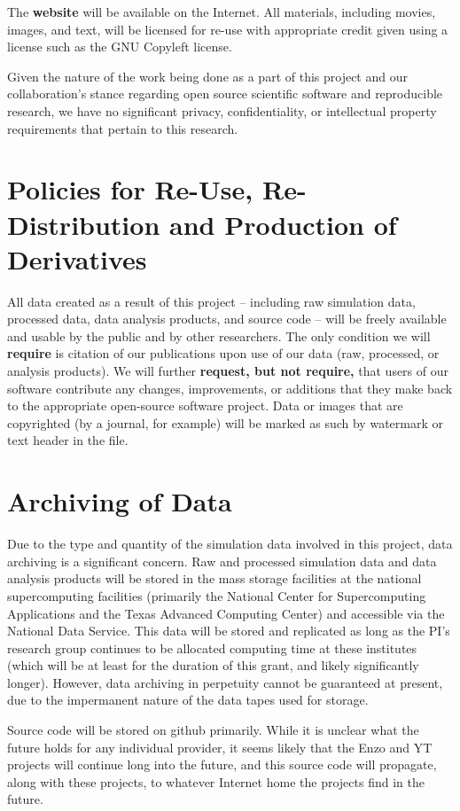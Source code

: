 \documentclass[11pt]{article}
\begin{document}
\noindent The \textbf{website} will be available on the Internet.  All materials,
including movies, images, and text, will be licensed for re-use with
appropriate credit given using a license such as the GNU Copyleft
license.

Given the nature of the work being done as a part of this project and
our collaboration's stance regarding open source scientific software
and reproducible research, we have no significant privacy,
confidentiality, or intellectual property requirements that pertain to
this research.

\vspace{-3mm}
\section{Policies for Re-Use, Re-Distribution and Production of
  Derivatives}
\vspace{-3mm}

All data created as a result of this project – including raw
simulation data, processed data, data analysis products, and source
code – will be freely available and usable by the public and by other
researchers.  The only condition we will \textbf{require} is citation
of our publications upon use of our data (raw, processed, or analysis
products).  We will further \textbf{request, but not require,} that
users of our software contribute any changes, improvements, or
additions that they make back to the appropriate open-source software
project.  Data or images that are copyrighted (by a journal, for
example) will be marked as such by watermark or text header in the
file.

\vspace{-3mm}
\section{Archiving of Data}
\vspace{-3mm}

Due to the type and quantity of the simulation data involved in this
project, data archiving is a significant concern.  Raw and processed
simulation data and data analysis products will be stored in the mass
storage facilities at the national supercomputing facilities
(primarily the National Center for Supercomputing Applications and the
Texas Advanced Computing Center) and accessible via the National Data
Service.  This data will be stored and replicated as long as the PI's
research group continues to be allocated computing time at these
institutes (which will be at least for the duration of this grant, and
likely significantly longer).  However, data archiving in perpetuity
cannot be guaranteed at present, due to the impermanent nature of the
data tapes used for storage.

Source code will be stored on github primarily.  While it is unclear what the future holds
for any individual provider, it seems likely that the Enzo and YT
projects will continue long into the future, and this source code will
propagate, along with these projects, to whatever Internet home the
projects find in the future.
\end{document}
